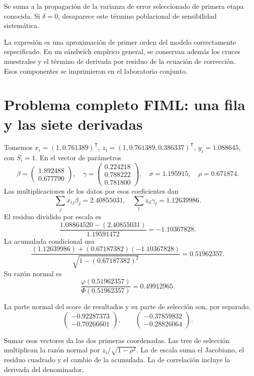 \documentclass[11pt,a4paper]{article}
\newcommand{\T}{^{\mathsf T}}
\begin{document}
Se suma a la propagación de la varianza de error
seleccionado de primera etapa conocida.
Si \(\delta=0\), desaparece este término poblacional
de sensibilidad sistemática.

La expresión es una aproximación de primer orden del modelo
correctamente especificado. En un sándwich empírico general,
se conservan además los cruces muestrales y el término de
derivada por residuo de la ecuación de corrección.
Esos componentes se imprimieron en el laboratorio conjunto.

\clearpage
\section{Problema completo FIML: una fila y las siete derivadas}\label{unidad178}
\begin{ejemplo}Tomemos \(x_i=(1,0.761389)\T\), \(z_i=(1,0.761389,0.386337)\T\), \(y_i=1.088645\), con \(S_i=1\). En el vector de parámetros \[
\beta=\begin{pmatrix}1.892488\\0.677790\end{pmatrix},\quad\gamma=\begin{pmatrix}0.224218\\0.788222\\0.781800\end{pmatrix},\quad\sigma=1.195915,\quad\rho=0.671874.
\]
Las multiplicaciones de los datos por esos coeficientes dan \[
\sum_jx_{ij}\beta_j=2.40855031,\quad\sum_lz_{il}\gamma_l=1.12639986.
\]
El residuo dividido por escala es \[
\frac{1.08864520-(2.40855031)}{1.19591472}=-1.10367828.
\]
La acumulada condicional usa \[
\frac{(1.12639986)+(0.67187382)(-1.10367828)}{\sqrt{1-(0.67187382)^2}}=0.51962357.
\]
Su razón normal es \[
\frac{\varphi(0.51962357)}{\Phi(0.51962357)}=0.49912965.
\]

La parte normal del score de resultados y su parte de selección
son, por separado,
\[
\begin{pmatrix}-0.92287373\\-0.70266601\end{pmatrix},\qquad\begin{pmatrix}-0.37859832\\-0.28826064\end{pmatrix}.
\]

Sumar esos vectores da las dos primeras coordenadas.
Las tres de selección multiplican la razón normal por
\(z_i/\sqrt{1-\rho^2}\).
La de escala suma el Jacobiano, el residuo cuadrado
y el cambio de la acumulada.
La de correlación incluye la derivada del denominador.


\end{ejemplo}
\end{document}
